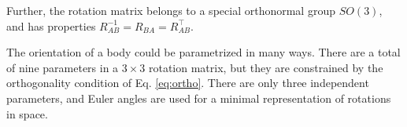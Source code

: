 Further, the rotation matrix belongs to a special orthonormal group $SO(3)$, and has properties $R_{AB}^{-1} = R_{BA} = R_{AB}^{\intercal}$.

The orientation of a body could be parametrized in many ways. There are a total of nine parameters in a $3 \times 3$ rotation matrix, but they are constrained by the orthogonality condition of Eq. \ref{eq:ortho}. There are only three independent parameters, and Euler angles are used for a minimal representation of rotations in space.

